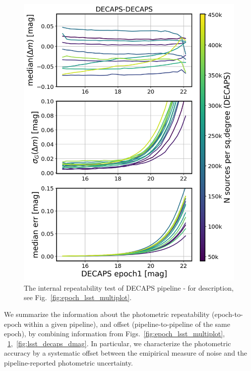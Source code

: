 \documentclass[DM,lsstdraft,toc,usenatbib]{lsstdoc}
\begin{document}
\begin{figure}
\begin{centering}
\includegraphics[width=0.8\columnwidth]{figs/decaps-decaps_rms_plot.png}
\caption{The internal repeatability test of DECAPS pipeline - for description, see Fig.~\ref{fig:epoch_lsst_multiplot}.}
\label{fig:epoch_decaps_multiplot}
\end{centering}
\end{figure} 


We summarize the information about the photometric repeatability (epoch-to-epoch within a given pipeline), and offset (pipeline-to-pipeline of the same epoch), by combining information from  Figs.~\ref{fig:epoch_lsst_multiplot}, ~\ref{fig:epoch_decaps_multiplot},~\ref{fig:lsst_decaps_dmag}. In particular, we characterize the photometric accuracy by a systematic offset between the emipirical measure of noise and the pipeline-reported photometric uncertainty. 
\end{document}
